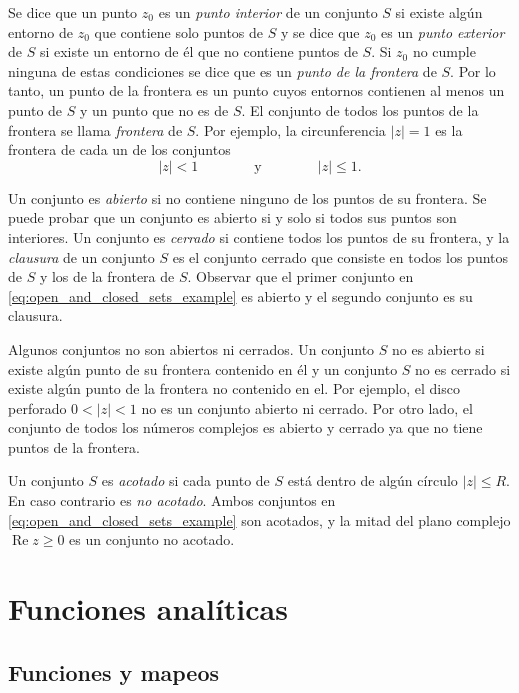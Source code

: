\documentclass[a4paper]{report}
\renewcommand{\Re}{\operatorname{Re}}
\begin{document}
Se dice que un punto \(z_0\) es un \emph{punto interior} de un conjunto \(S\) si existe algún entorno de \(z_0\) que contiene solo puntos de \(S\) y se dice que \(z_0\) es un \emph{punto exterior} de \(S\) si existe un entorno de él que no contiene puntos de \(S\). Si \(z_0\) no cumple ninguna de estas condiciones se dice que es un \emph{punto de la frontera} de \(S\). Por lo tanto, un punto de la frontera es un punto cuyos entornos contienen al menos un punto de \(S\) y un punto que no es de \(S\). El conjunto de todos los puntos de la frontera se llama \emph{frontera} de \(S\). Por ejemplo, la circunferencia \(|z|=1\) es la frontera de cada un de los conjuntos
\begin{equation}\label{eq:open_and_closed_sets_example}
 |z|<1
 \qquad\qquad\textrm{y}\qquad\qquad
 |z|\leq1.
\end{equation}

Un conjunto es \emph{abierto} si no contiene ninguno de los puntos de su frontera. Se puede probar que un conjunto es abierto si y solo si todos sus puntos son interiores. Un conjunto es \emph{cerrado} si contiene todos los puntos de su frontera, y la \emph{clausura} de un conjunto \(S\) es el conjunto cerrado que consiste en todos los puntos de \(S\) y los de la frontera de \(S\). Observar que el primer conjunto en \ref{eq:open_and_closed_sets_example} es abierto y el segundo conjunto es su clausura.

Algunos conjuntos no son abiertos ni cerrados. Un conjunto \(S\) no es abierto si existe algún punto de su frontera contenido en él y un conjunto \(S\) no es cerrado si existe algún punto de la frontera no contenido en el. Por ejemplo, el disco perforado \(0<|z|<1\) no es un conjunto abierto ni cerrado. Por otro lado, el conjunto de todos los números complejos es abierto y cerrado ya que no tiene puntos de la frontera.  

Un conjunto \(S\) es \emph{acotado} si cada punto de \(S\) está dentro de algún círculo \(|z|\leq R\). En caso contrario es \emph{no acotado}. Ambos conjuntos en \ref{eq:open_and_closed_sets_example} son acotados, y la mitad del plano complejo \(\Re z\geq0\) es un conjunto no acotado.

\chapter{Funciones analíticas}

\section{Funciones y mapeos}
\end{document}
